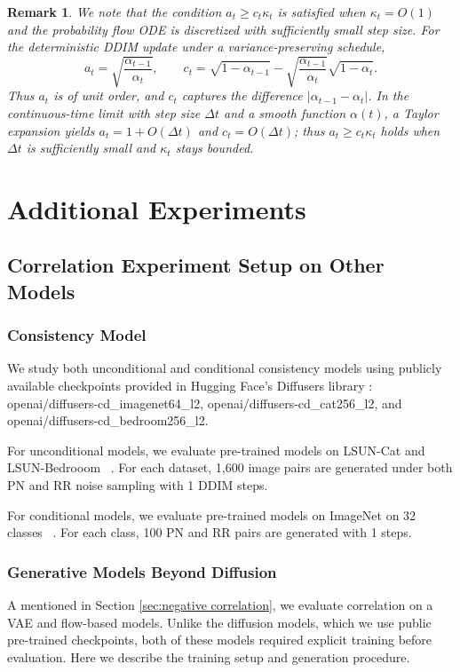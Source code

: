 \documentclass[12pt]{article}
\newcommand{\0}{\mathbf{0}}
\newtheorem{remark}{Remark}
\begin{document}
\begin{remark}
We note that the condition $a_t \ge c_t \kappa_t$ is  satisfied when $\kappa_t = O(1)$ and the probability flow ODE is discretized with sufficiently small step size. For the deterministic DDIM update under a variance-preserving schedule,
\[
a_t = \sqrt{\frac{\alpha_{t-1}}{\alpha_t}},\qquad
c_t = \sqrt{1-\alpha_{t-1}}
- \sqrt{\frac{\alpha_{t-1}}{\alpha_t}}\sqrt{1-\alpha_t}.
\]
Thus $a_t$ is of unit order, and $c_t$ captures the difference $|\alpha_{t-1}-\alpha_t|$. In the continuous-time limit with step size $\Delta t$ and a smooth function $\alpha(t)$, a Taylor expansion yields $a_t = 1 + O(\Delta t)$ and $c_t = O(\Delta t)$; thus $a_t \ge c_t \kappa_t$ holds  when $\Delta t$ is sufficiently small and $\kappa_t$ stays bounded.
  \end{remark}




\section{Additional Experiments}\label{sec:additional experiments}
\subsection{Correlation Experiment Setup on Other Models}\label{subsec: model Training}


\subsubsection{Consistency Model}
We study both unconditional and conditional consistency models using publicly available checkpoints provided in Hugging Face’s Diffusers library \citep{von-platen-etal-2022-diffusers}: openai/diffusers-cd\_imagenet64\_l2, openai/diffusers-cd\_cat256\_l2, and openai/diffusers-cd\_bedroom256\_l2. 

For unconditional models, we evaluate pre-trained models on LSUN-Cat and LSUN-Bedrooom ~\citep{yu2015lsun}. For each dataset, 1,600 image pairs are generated under both PN and RR noise sampling with 1 DDIM steps.

For conditional models, we evaluate pre-trained models on ImageNet on 32 classes ~\citep{deng2009imagenet}. For each class, 100 PN and RR pairs are generated with 1 steps.



\subsubsection{Generative Models Beyond Diffusion}
A mentioned in Section \ref{sec:negative correlation}, we evaluate correlation on a VAE and flow-based models. Unlike the diffusion models, which we use public pre-trained checkpoints, both of these models required explicit training before evaluation. Here we describe the training setup and generation procedure.
\end{document}
